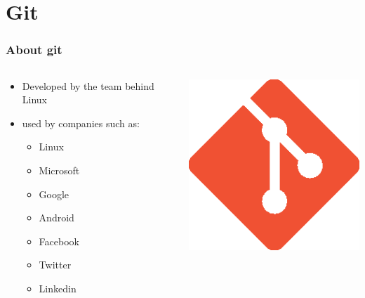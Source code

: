 \section[Git]{Git}
\begin{frame}
	\frametitle{About git}
	\begin{columns}
		\begin{column}{0.7\textwidth}
			\begin{itemize}[<+->]
				\item Developed by the team behind Linux
				\item used by companies such as:
				\begin{itemize}[<+->]
					\item Linux
					\item Microsoft
					\item Google
					\item Android
					\item Facebook
					\item Twitter
					\item Linkedin
				\end{itemize}
			\end{itemize}
		\end{column}
		\begin{column}{0.3\textwidth}
			\includegraphics{./pictures/Git-Icon.eps}
		\end{column}
	\end{columns}
\end{frame}
